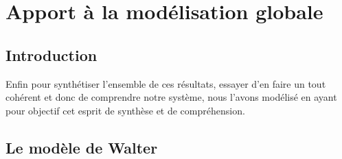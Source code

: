 \chapter{Apport à la modélisation globale}
\newpage


\section{Introduction}
Enfin pour synthétiser l'ensemble de ces résultats, essayer d'en faire un tout cohérent et donc de comprendre notre système, nous l'avons modélisé en ayant pour objectif cet esprit de synthèse et de compréhension.
\section{Le modèle de Walter}